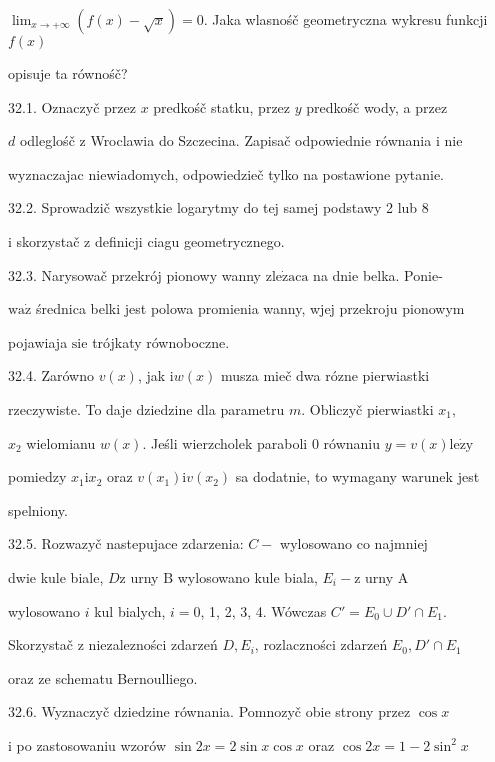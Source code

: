 \documentclass[a4paper,12pt]{article}
\begin{document}
$\displaystyle \lim_{x\rightarrow+\infty}(f(x)-\sqrt{x})=0$. Jaka wlasnośč geometryczna wykresu funkcji $f(x)$

opisuje ta równośč?

32.1. Oznaczyč przez $x$ predkośč statku, przez $y$ predkośč wody, a przez

$d$ odleglośč $\mathrm{z}$ Wroclawia do Szczecina. Zapisač odpowiednie równania $\mathrm{i}$ nie

wyznaczajac niewiadomych, odpowiedzieč tylko na postawione pytanie.

32.2. Sprowadzič wszystkie logarytmy do tej samej podstawy 2 lub 8

$\mathrm{i}$ skorzystač $\mathrm{z}$ definicji ciagu geometrycznego.

32.3. Narysowač przekrój pionowy wanny $\mathrm{z}\mathrm{l}\mathrm{e}\dot{\mathrm{z}}\mathrm{a}\mathrm{c}\mathrm{a}$ na dnie belka. Ponie-

$\mathrm{w}\mathrm{a}\dot{\mathrm{z}}$ średnica belki jest polowa promienia wanny, wjej przekroju pionowym

pojawiaja $\mathrm{s}\mathrm{i}\mathrm{e}$ trójkaty równoboczne.

32.4. Zarówno $v(x)$, jak $\mathrm{i} w(x)$ musza mieč dwa rózne pierwiastki

rzeczywiste. To daje dziedzine dla parametru $m$. Obliczyč pierwiastki $x_{1},$

$x_{2}$ wielomianu $w(x)$. Jeśli wierzcholek paraboli $0$ równaniu $y=v(x) \mathrm{l}\mathrm{e}\dot{\mathrm{z}}\mathrm{y}$

pomiedzy $x_{1}\mathrm{i}x_{2}$ oraz $v(x_{1})\mathrm{i}v(x_{2})$ sa dodatnie, to wymagany warunek jest

spelniony.

32.5. Rozwazyč nastepujace zdarzenia: $C -$ wylosowano co najmniej

dwie kule biale, $D \mathrm{z}$ urny $\mathrm{B}$ wylosowano kule biala, $E_{i} - \mathrm{z}$ urny $\mathrm{A}$

wylosowano $i$ kul bialych, $i=0$, 1, 2, 3, 4. Wówczas $C'=E_{0}\cup D'\cap E_{1}.$

Skorzystač $\mathrm{z}$ niezalezności zdarzeń $D, E_{i}$, rozlaczności zdarzeń $E_{0}, D'\cap E_{1}$

oraz ze schematu Bernoulliego.

32.6. Wyznaczyč dziedzine równania. Pomnozyč obie strony przez $\cos x$

$\mathrm{i}$ po zastosowaniu wzorów $\sin 2x = 2\sin x\cos x$ oraz $\cos 2x = 1-2\sin^{2}x$
\end{document}
